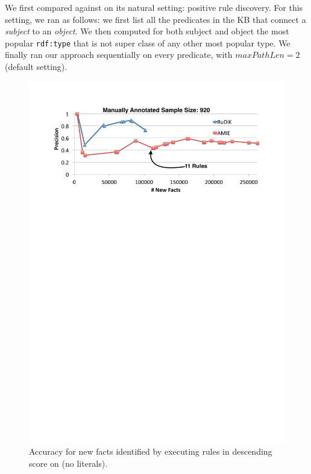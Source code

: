  We first compared against \amie on its natural setting: positive rule discovery. 
For this setting, we ran \krd as follows: we first list all the predicates in the KB that connect a \emph{subject} to an \emph{object}. We then computed %
for both subject and object %
the most popular \texttt{rdf:type} that is not super class of any other most popular type. We finally ran our approach sequentially on every predicate, with $maxPathLen=2$ (\amie default setting).


\begin{figure}[b]
	\centering
	\includegraphics[width=.9\columnwidth]{include/figure/vsAmieYago.pdf}
	\vspace{-2ex}
	\caption{Accuracy for new facts identified by executing rules in descending score on   (no literals).}
	\label{fig:vs_amie_yago}
\end{figure}


